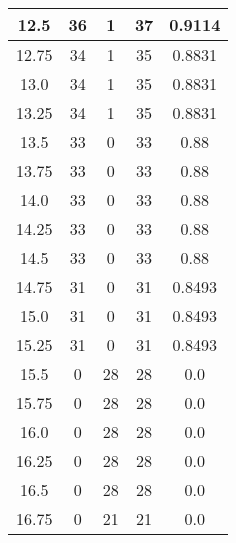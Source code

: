 \documentclass[letterpaper, 12pt]{article}
\begin{document}
\begin{longtable}{|c|c|c|c|c|}
12.5 & 36 & 1 & 37 & 0.9114 \\
\hline
12.75 & 34 & 1 & 35 & 0.8831 \\
\hline
13.0 & 34 & 1 & 35 & 0.8831 \\
\hline
13.25 & 34 & 1 & 35 & 0.8831 \\
\hline
13.5 & 33 & 0 & 33 & 0.88 \\
\hline
13.75 & 33 & 0 & 33 & 0.88 \\
\hline
14.0 & 33 & 0 & 33 & 0.88 \\
\hline
14.25 & 33 & 0 & 33 & 0.88 \\
\hline
14.5 & 33 & 0 & 33 & 0.88 \\
\hline
14.75 & 31 & 0 & 31 & 0.8493 \\
\hline
15.0 & 31 & 0 & 31 & 0.8493 \\
\hline
15.25 & 31 & 0 & 31 & 0.8493 \\
\hline
15.5 & 0 & 28 & 28 & 0.0 \\
\hline
15.75 & 0 & 28 & 28 & 0.0 \\
\hline
16.0 & 0 & 28 & 28 & 0.0 \\
\hline
16.25 & 0 & 28 & 28 & 0.0 \\
\hline
16.5 & 0 & 28 & 28 & 0.0 \\
\hline
16.75 & 0 & 21 & 21 & 0.0 \\
\hline
\end{longtable}
\end{document}
